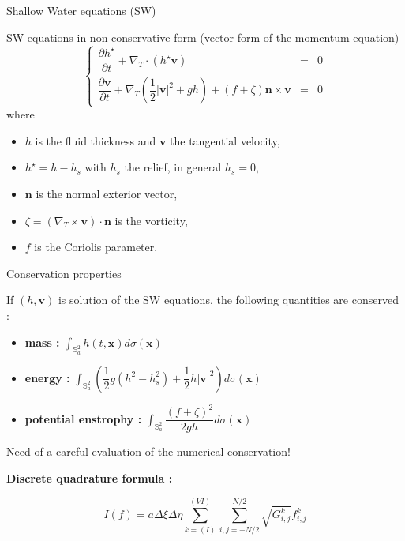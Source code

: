 \documentclass[11pt]{beamer}
\def\gint{\displaystyle\int}
\begin{document}
\begin{frame}{Shallow Water equations (SW)}
\begin{block}{SW equations in non conservative form (vector form of the momentum equation)}
\begin{equation}
\left\lbrace
\begin{array}{rcl}
\dfrac{\partial h^{\star}}{\partial t} + \nabla_T \cdot \left( h^{\star} \mathbf{v} \right) & = & 0 \\
\dfrac{\partial \mathbf{v}}{\partial t} + \nabla_T \left( \dfrac{1}{2}|\mathbf{v}|^2 + gh \right) + \left( f + \zeta \right) \mathbf{n} \times \mathbf{v} & = & 0
\end{array}
\right.
\end{equation}
where 
\begin{itemize}
\item $h$ is the fluid thickness and $\mathbf{v}$ the tangential velocity,
\item $h^{\star}=h-h_s$ with $h_s$ the relief, in general $h_s=0$,
\item $\mathbf{n}$ is the normal exterior vector, 
\item $\zeta = \left( \nabla_T \times \mathbf{v} \right) \cdot \mathbf{n}$ is the vorticity,
\item $f$ is the Coriolis parameter.
\end{itemize}
\end{block}
\end{frame}


\begin{frame}{Conservation properties}
\begin{block}{}
If $(h, \mathbf{v})$ is solution of the SW equations, the following quantities are conserved :

\begin{itemize}
\item \textbf{mass :} 
$\gint_{\mathbb{S}^2_a} h(t, \mathbf{x}) d \sigma(\mathbf{x})$
\item \textbf{energy :}
$ \gint_{\mathbb{S}^2_a} \left( \dfrac{1}{2}g(h^2 - h_s^2) + \dfrac{1}{2} h | \mathbf{v} |^2 \right) d \sigma(\mathbf{x})$
\item \textbf{potential enstrophy :}
$\gint_{\mathbb{S}^2_a} \dfrac{\left( f + \zeta \right)^2}{2gh} d \sigma(\mathbf{x})$
\end{itemize}
\end{block}

Need of a careful evaluation of the numerical conservation!

\textbf{Discrete quadrature formula :}

$$I(f) = a \Delta \xi \Delta \eta   \sum_{k=(I)}^{(VI)} \sum_{i,j=-N/2}^{N/2}  \sqrt{G_{i,j}^k} f_{i,j}^{k} $$

\end{frame}
\end{document}

